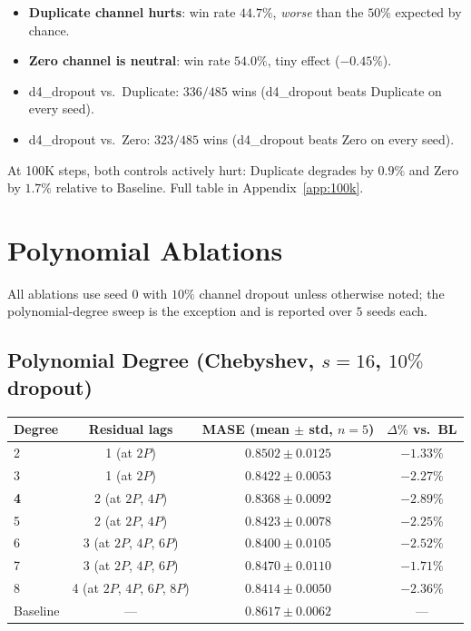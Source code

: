 \documentclass[11pt]{article}
\theoremstyle{plain}
\theoremstyle{definition}
\theoremstyle{remark}
\newcommand{\HD}{\textsf{d4\_dropout}}
\begin{document}
\begin{itemize}[leftmargin=1.5em]
    \item \textbf{Duplicate channel hurts}: win rate $44.7\%$, \emph{worse} than the $50\%$ expected by chance.
    \item \textbf{Zero channel is neutral}: win rate $54.0\%$, tiny effect ($-0.45\%$).
    \item \HD{} vs.\ Duplicate: $336/485$ wins (\HD{} beats Duplicate on every seed).
    \item \HD{} vs.\ Zero: $323/485$ wins (\HD{} beats Zero on every seed).
\end{itemize}

At 100K steps, both controls actively hurt: Duplicate degrades by $0.9\%$ and Zero by $1.7\%$ relative to Baseline. Full table in Appendix~\ref{app:100k}.

\section{Polynomial Ablations}
\label{app:ablations}

All ablations use seed 0 with $10\%$ channel dropout unless otherwise noted; the polynomial-degree sweep is the exception and is reported over $5$ seeds each.

\subsection{Polynomial Degree (Chebyshev, $s=16$, $10\%$ dropout)}

\begin{table}[h]
\centering
\small
\begin{tabular}{lccc}
\toprule
\textbf{Degree} & \textbf{Residual lags} & \textbf{MASE (mean $\pm$ std, $n=5$)} & \textbf{$\Delta\%$ vs.\ BL} \\
\midrule
2 & 1 (at $2P$) & $0.8502 \pm 0.0125$ & $-1.33\%$ \\
3 & 1 (at $2P$) & $0.8422 \pm 0.0053$ & $-2.27\%$ \\
\textbf{4} & 2 (at $2P$, $4P$) & $\mathbf{0.8368 \pm 0.0092}$ & $\mathbf{-2.89\%}$ \\
5 & 2 (at $2P$, $4P$) & $0.8423 \pm 0.0078$ & $-2.25\%$ \\
6 & 3 (at $2P$, $4P$, $6P$) & $0.8400 \pm 0.0105$ & $-2.52\%$ \\
7 & 3 (at $2P$, $4P$, $6P$) & $0.8470 \pm 0.0110$ & $-1.71\%$ \\
8 & 4 (at $2P$, $4P$, $6P$, $8P$) & $0.8414 \pm 0.0050$ & $-2.36\%$ \\
\midrule
Baseline & --- & $0.8617 \pm 0.0062$ & --- \\
\bottomrule
\end{tabular}
\end{table}
\end{document}
